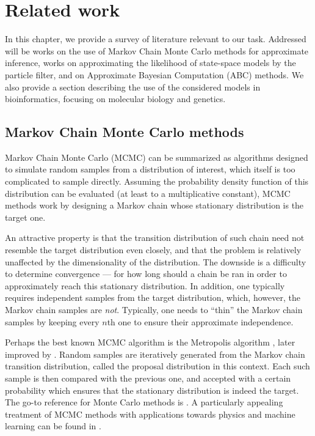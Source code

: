 \chapter{Related work}
\label{chap:related-work}

In this chapter, we provide a survey of literature relevant to our task. Addressed will be works on the use of Markov Chain Monte Carlo methods for approximate inference, works on approximating the likelihood of state-space models by the particle filter, and on Approximate Bayesian Computation (ABC) methods. We also provide a section describing the use of the considered models in bioinformatics, focusing on molecular biology and genetics.

\section{Markov Chain Monte Carlo methods}
Markov Chain Monte Carlo (MCMC) can be summarized as algorithms designed to simulate random samples from a distribution of interest, which itself is too complicated to sample directly. Assuming the probability density function of this distribution can be evaluated (at least to a multiplicative constant), MCMC methods work by designing a Markov chain whose stationary distribution is the target one.

An attractive property is that the transition distribution of such chain need not resemble the target distribution even closely, and that the problem is relatively unaffected by the dimensionality of the distribution. The downside is a difficulty to determine convergence --- for how long should a chain be ran in order to approximately reach this stationary distribution. In addition, one typically requires independent samples from the target distribution, which, however, the Markov chain samples are \emph{not}. Typically, one needs to ``thin'' the Markov chain samples by keeping every $n$th one to ensure their approximate independence.

Perhaps the best known MCMC algorithm is the Metropolis algorithm \citep{metropolis}, later improved by \cite{hastings}. Random samples are iteratively generated from the Markov chain transition distribution, called the proposal distribution in this context. Each such sample is then compared with the previous one, and accepted with a certain probability which ensures that the stationary distribution is indeed the target. The go-to reference for Monte Carlo methods is \cite{robert-casella}. A particularly appealing treatment of MCMC methods with applications towards physics and machine learning can be found in \cite{information-theory}.

